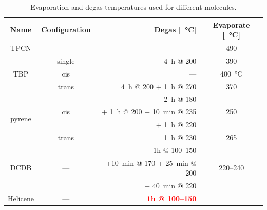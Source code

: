 \begin{table}\centering
	\caption{Evaporation and degas temperatures used for different molecules.}
	\begin{tabular}{ccrc}
		Name			& Configuration & Degas [\SI{}{\celsius}]	& Evaporate [\SI{}{\celsius}]	\\ \hline \hline 
		TPCN			& ---		& ---		& 490		\\ \hline 
		\multirow{3}{*}{TBP}	&single		& \SI{4}{\hour} @ \SI{200}{}& 390	\\
		&cis		& ---		& \SI{400}{\celsius}\\
		&trans		& \SI{4}{\hour} @ \SI{200}{} + \SI{1}{\hour} @ \SI{270}{}&\SI{370}{}\\ \hline 
		\multirow{4}{*}{pyrene} & \multirow{3}{*}{cis}		& \SI{2}{\hour} @ \SI{180}{}&	\multirow{3}{*}{250}	\\
		&&+ \SI{1}{\hour} @ \SI{200}{} + \SI{10}{\minute} @ \SI{235}{} 	&\\
		&&+ \SI{1}{\hour} @ \SI{220}{}&\\ 
		&trans		& \SI{1}{\hour} @ \SI{230}{}		&\SI{265}{}		\\ \hline
		\multirow{3}{*}{DCDB} & \multirow{3}{*}{---} & 1h @ \SIrange{100}{150}{}& \multirow{3}{*}{\SIrange{220}{240}{}}\\
		&&+\SI{10}{\minute} @ \SI{170}{} + \SI{25}{\minute} @ \SI{200}{} & \\
		&&+ \SI{40}{\minute} @ \SI{220}{}&\\
		\hline
		Helicene & --- & \textcolor{red}{\textbf{1h @ \SIrange{100}{150}{}}} & \\
	\end{tabular}
	\label{tab:molecule-temperatures}
\end{table}